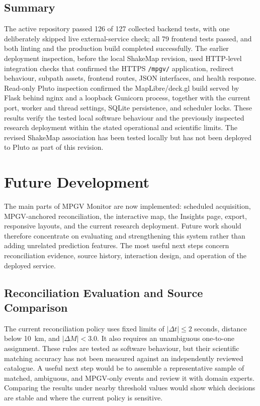 \documentclass[12pt]{article}
\begin{document}
\subsection{Summary}

The active repository passed 126 of 127 collected backend tests, with one deliberately skipped live external-service check; all 79 frontend tests passed, and both linting and the production build completed successfully. The earlier deployment inspection, before the local ShakeMap revision, used HTTP-level integration checks that confirmed the HTTPS \texttt{/mpgv/} application, redirect behaviour, subpath assets, frontend routes, JSON interfaces, and health response. Read-only Pluto inspection confirmed the MapLibre/deck.gl build served by Flask behind nginx and a loopback Gunicorn process, together with the current port, worker and thread settings, SQLite persistence, and scheduler locks. These results verify the tested local software behaviour and the previously inspected research deployment within the stated operational and scientific limits. The revised ShakeMap association has been tested locally but has not been deployed to Pluto as part of this revision.

\newpage

\section{Future Development}
\label{sec:future-development}

The main parts of MPGV Monitor are now implemented: scheduled acquisition, MPGV-anchored reconciliation, the interactive map, the Insights page, export, responsive layouts, and the current research deployment. Future work should therefore concentrate on evaluating and strengthening this system rather than adding unrelated prediction features. The most useful next steps concern reconciliation evidence, source history, interaction design, and operation of the deployed service.

\subsection{Reconciliation Evaluation and Source Comparison}

The current reconciliation policy uses fixed limits of $|\Delta t| \leq 2$ seconds, distance below 10~km, and $|\Delta M| < 3.0$. It also requires an unambiguous one-to-one assignment. These rules are tested as software behaviour, but their scientific matching accuracy has not been measured against an independently reviewed catalogue. A useful next step would be to assemble a representative sample of matched, ambiguous, and MPGV-only events and review it with domain experts. Comparing the results under nearby threshold values would show which decisions are stable and where the current policy is sensitive.
\end{document}
